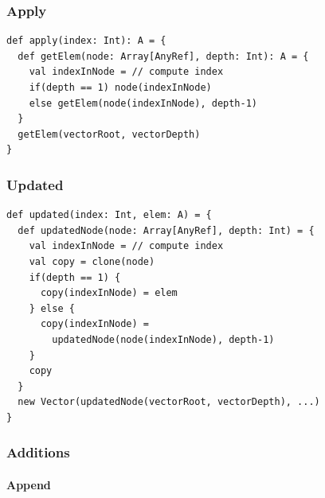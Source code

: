 
\subsubsection{Apply}

\begin{lstlisting}[frame=single]
def apply(index: Int): A = {
  def getElem(node: Array[AnyRef], depth: Int): A = {
    val indexInNode = // compute index
    if(depth == 1) node(indexInNode)
    else getElem(node(indexInNode), depth-1) 
  }
  getElem(vectorRoot, vectorDepth)
}

\end{lstlisting}


\subsubsection{Updated}

\begin{lstlisting}[frame=single]
def updated(index: Int, elem: A) = {
  def updatedNode(node: Array[AnyRef], depth: Int) = {
    val indexInNode = // compute index
    val copy = clone(node)
    if(depth == 1) {
      copy(indexInNode) = elem
    } else {
      copy(indexInNode) = 
        updatedNode(node(indexInNode), depth-1)
    }
    copy
  }
  new Vector(updatedNode(vectorRoot, vectorDepth), ...)
}
\end{lstlisting}


\subsubsection{Additions}

\paragraph{Append}

